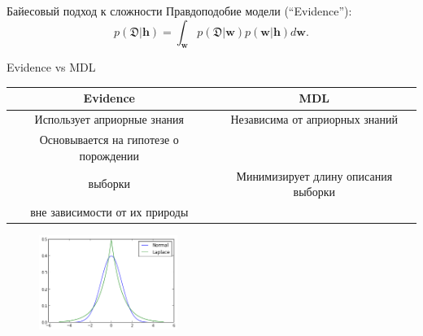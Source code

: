 \documentclass[usenames,dvipsnames,10pt,pdf,utf8,russian,aspectratio=43]{beamer}
\begin{document}
\begin{frame}{Байесовый подход к сложности}
Правдоподобие модели (``Evidence''):
\[
	p(\mathfrak{D}|\mathbf{h}) = \int_\mathbf{w} p(\mathfrak{D}|\mathbf{w})p(\mathbf{w}|\mathbf{h}) d\mathbf{w}.
\]


\begin{figure}
  \centering
\label{fig:1}\qquad

\end{figure}


\end{frame}

\begin{frame}{Evidence vs MDL}
\small
\begin{tabular}{ c | c  }
  \hline			
 \bf Evidence & \bf MDL \\
  \hline  
Использует априорные знания &  Независима от априорных знаний \\
  \hline  
Основывается на гипотезе о порождении\\ выборки & Минимизирует длину описания выборки\\ вне зависимости от их природы \\
  \hline  

\end{tabular}


\begin{figure}
  \centering
 \includegraphics[width=0.4\textwidth]{laplace.png}
\label{fig:1}\qquad

\end{figure}


\end{frame}
\end{document}
